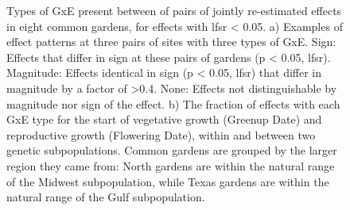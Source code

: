 \documentclass[
  9pt,
  twocolumn,
  twoside]{pnas-new}
\begin{document}
\begin{figure}


\caption{\label{fig-effects}Types of GxE present between of pairs of
jointly re-estimated effects in eight common gardens, for effects with
lfsr \textless{} 0.05. a) Examples of effect patterns at three pairs of
sites with three types of GxE. Sign: Effects that differ in sign at
these pairs of gardens (p \textless{} 0.05, lfsr). Magnitude: Effects
identical in sign (p \textless{} 0.05, lfsr) that differ in magnitude by
a factor of \textgreater0.4. None: Effects not distinguishable by
magnitude nor sign of the effect. b) The fraction of effects with each
GxE type for the start of vegetative growth (Greenup Date) and
reproductive growth (Flowering Date), within and between two genetic
subpopulations. Common gardens are grouped by the larger region they
came from: North gardens are within the natural range of the Midwest
subpopulation, while Texas gardens are within the natural range of the
Gulf subpopulation.}

\end{figure}%
\end{document}
